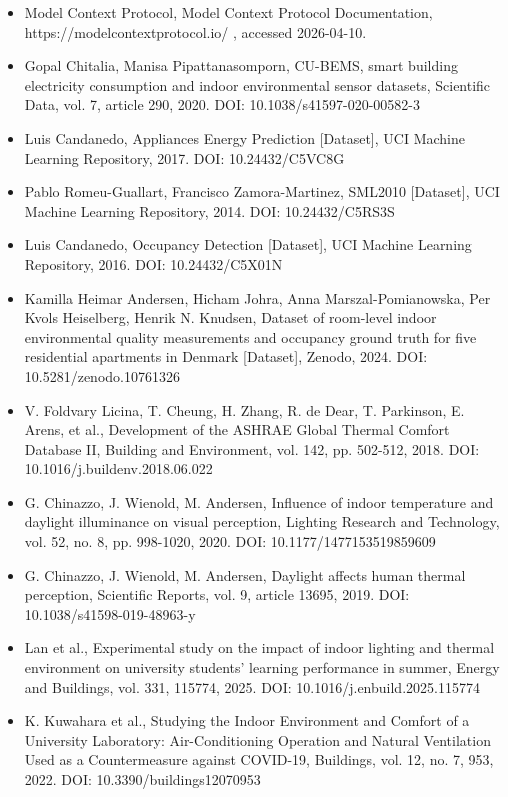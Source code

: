 \documentclass[12pt,a4paper]{article}
\begin{document}
\begin{itemize}
\item [11] Model Context Protocol, Model Context Protocol Documentation, https://modelcontextprotocol.io/ , accessed 2026-04-10.
\item [12] Gopal Chitalia, Manisa Pipattanasomporn, CU-BEMS, smart building electricity consumption and indoor environmental sensor datasets, Scientific Data, vol. 7, article 290, 2020. DOI: 10.1038/s41597-020-00582-3
\item [13] Luis Candanedo, Appliances Energy Prediction [Dataset], UCI Machine Learning Repository, 2017. DOI: 10.24432/C5VC8G
\item [14] Pablo Romeu-Guallart, Francisco Zamora-Martinez, SML2010 [Dataset], UCI Machine Learning Repository, 2014. DOI: 10.24432/C5RS3S
\item [15] Luis Candanedo, Occupancy Detection [Dataset], UCI Machine Learning Repository, 2016. DOI: 10.24432/C5X01N
\item [16] Kamilla Heimar Andersen, Hicham Johra, Anna Marszal-Pomianowska, Per Kvols Heiselberg, Henrik N. Knudsen, Dataset of room-level indoor environmental quality measurements and occupancy ground truth for five residential apartments in Denmark [Dataset], Zenodo, 2024. DOI: 10.5281/zenodo.10761326
\item [17] V. Foldvary Licina, T. Cheung, H. Zhang, R. de Dear, T. Parkinson, E. Arens, et al., Development of the ASHRAE Global Thermal Comfort Database II, Building and Environment, vol. 142, pp. 502-512, 2018. DOI: 10.1016/j.buildenv.2018.06.022
\item [18] G. Chinazzo, J. Wienold, M. Andersen, Influence of indoor temperature and daylight illuminance on visual perception, Lighting Research and Technology, vol. 52, no. 8, pp. 998-1020, 2020. DOI: 10.1177/1477153519859609
\item [19] G. Chinazzo, J. Wienold, M. Andersen, Daylight affects human thermal perception, Scientific Reports, vol. 9, article 13695, 2019. DOI: 10.1038/s41598-019-48963-y
\item [20] Lan et al., Experimental study on the impact of indoor lighting and thermal environment on university students' learning performance in summer, Energy and Buildings, vol. 331, 115774, 2025. DOI: 10.1016/j.enbuild.2025.115774
\item [21] K. Kuwahara et al., Studying the Indoor Environment and Comfort of a University Laboratory: Air-Conditioning Operation and Natural Ventilation Used as a Countermeasure against COVID-19, Buildings, vol. 12, no. 7, 953, 2022. DOI: 10.3390/buildings12070953

\end{itemize}
\end{document}

